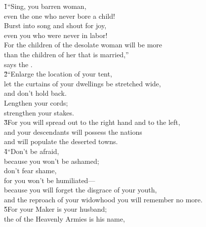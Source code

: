 \begin{poetry}
\poeml {}
\v{1}``Sing, you barren woman, \\
\poemll    even the one who never bore a child! \\
\poeml Burst into song and shout for joy, \\
\poemll    even you who were never in labor! \\
\poeml For the children of the desolate woman will be more \\
\poemll    than the children of her that is married,'' \\
\poemlll       says the . \\
\poeml \v{2}``Enlarge the location of your tent, \\
\poemll    let the curtains of your dwellings be stretched wide, \\
\poemlll       and don't hold back. \\
\poeml Lengthen your cords; \\
\poemlll       strengthen your stakes. \\
\poeml \v{3}For you will spread out to the right hand and to the left, \\
\poemll    and your descendants will possess the nations \\
\poemlll       and will populate the deserted towns. \\
\poeml \v{4}``Don't be afraid, \\
\poemll    because you won't be ashamed; \\
\poeml don't fear shame, \\
\poemll    for you won't be humiliated--- \\
\poeml because you will forget the disgrace of your youth, \\
\poemll    and the reproach of your widowhood you will remember no more. \\
\poeml \v{5}For your Maker is your husband; \\
\poemll    the  of the Heavenly Armies is his name, \\

\end{poetry}
